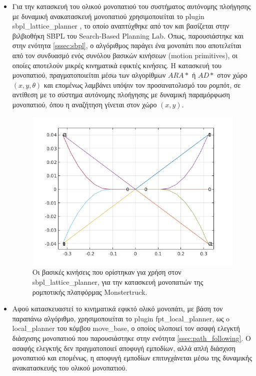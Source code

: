\begin{itemize}
	\item Για την κατασκευή του ολικού μονοπατιού του συστήματος αυτόνομης πλοήγησης με δυναμική ανακατασκευή μονοπατιού χρησιμοποιείται το plugin sbpl{\_}lattice{\_}planner , το οποίο αναπτύχθηκε από τον \citeauthor{sbpl_lattice_planner}\cite{sbpl_lattice_planner} και βασίζεται στην βιλβιοθήκη SBPL \cite{sbpl_library} του Search-Based Planning Lab. Όπως, παρουσιάστηκε και στην ενότητα \ref{sssec:sbpl}, ο αλγόριθμος παράγει ένα μονοπάτι που αποτελείται από τον συνδυασμό ενός συνόλου βασικών κινήσεων (motion primitives), οι οποίες αποτελούν μικρές κινηματικά εφικτές κινήσεις. Η κατασκευή του μονοπατιού, πραγματοποιείται μέσω των αλγορίθμων $ARA*$ ή $AD*$ στον χώρο $(x,y,\theta)$ και επομένως λαμβάνει υπόψιν τον προσανατολισμό του ρομπότ, σε αντίθεση με το σύστημα αυτόνομης πλοήγησης με δυναμική παραμόρφωση μονοπατιού, όπου η αναζήτηση γίνεται στον χώρο $(x,y)$.

\begin{figure}[!ht]
	\centering
	\includegraphics[width=0.6\linewidth]{Chapters/Chapter4/Figures/motion_primitives.png}
	\caption{Οι βασικές κινήσεις που ορίστηκαν για χρήση στον sbpl{\_}lattice{\_}planner, για την κατασκευή μονοπατιών της ρομποτικής πλατφόρμας Monstertruck.}
	\label{fig:motion_primitives}
\end{figure}
		
	\item Αφού κατασκευαστεί το κινηματικά εφικτό ολικό μονοπάτι, με βάση τον παραπάνω αλγόριθμο, χρησιμοποιείται το plugin fpt{\_}local{\_}planner, ως o local{\_}planner του κόμβου move{\_}base, ο οποίος υλοποιεί τον ασαφή ελεγκτή διάσχισης μονοπατιού που παρουσιάστηκε στην ενότητα \ref{ssec:path_following}. Ο ασαφής ελεγκτής δεν πραγματοποιεί αποφυγή εμποδίων, αλλά απλή διάσχιση μονοπατιού και επομένως, η αποφυγή εμποδίων επιτυγχάνεται μέσω της δυναμικής ανακατασκευής του ολικού μονοπατιού.
\end{itemize}


